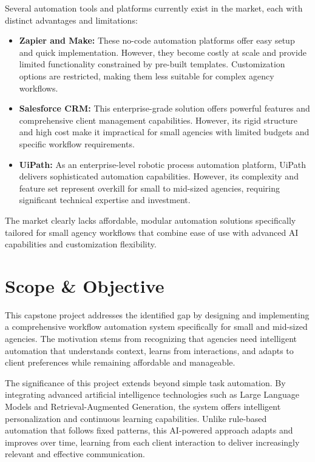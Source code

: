 \documentclass[12pt,a4paper]{report}
\begin{document}
Several automation tools and platforms currently exist in the market, each with distinct advantages and limitations:

\begin{itemize}
    \item \textbf{Zapier and Make:} These no-code automation platforms offer easy setup and quick implementation. However, they become costly at scale and provide limited functionality constrained by pre-built templates. Customization options are restricted, making them less suitable for complex agency workflows.
    \item \textbf{Salesforce CRM:} This enterprise-grade solution offers powerful features and comprehensive client management capabilities. However, its rigid structure and high cost make it impractical for small agencies with limited budgets and specific workflow requirements.
    \item \textbf{UiPath:} As an enterprise-level robotic process automation platform, UiPath delivers sophisticated automation capabilities. However, its complexity and feature set represent overkill for small to mid-sized agencies, requiring significant technical expertise and investment.
\end{itemize}

The market clearly lacks affordable, modular automation solutions specifically tailored for small agency workflows that combine ease of use with advanced AI capabilities and customization flexibility.

\section{Scope \& Objective}
This capstone project addresses the identified gap by designing and implementing a comprehensive workflow automation system specifically for small and mid-sized agencies. The motivation stems from recognizing that agencies need intelligent automation that understands context, learns from interactions, and adapts to client preferences while remaining affordable and manageable.

The significance of this project extends beyond simple task automation. By integrating advanced artificial intelligence technologies such as Large Language Models and Retrieval-Augmented Generation, the system offers intelligent personalization and continuous learning capabilities. Unlike rule-based automation that follows fixed patterns, this AI-powered approach adapts and improves over time, learning from each client interaction to deliver increasingly relevant and effective communication.
\end{document}
